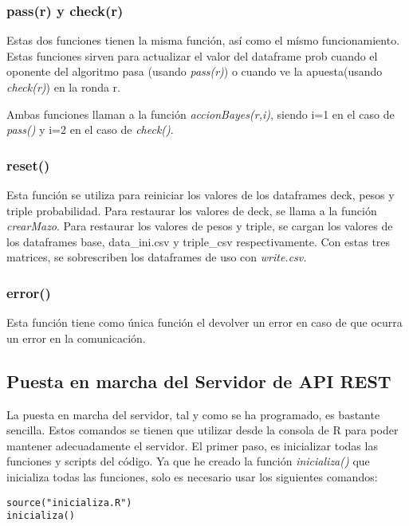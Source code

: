 \subsubsection{pass(r) y check(r)}

Estas dos funciones tienen la misma función, así como el mísmo funcionamiento. Estas funciones sirven para actualizar el valor del dataframe prob cuando el oponente del algoritmo pasa (usando  \textit{pass(r)}) o cuando ve la apuesta(usando  \textit{check(r)}) en la ronda r.

Ambas funciones llaman a la función  \textit{accionBayes(r,i)}, siendo i=1 en el caso de  \textit{pass()} y i=2 en el caso de  \textit{check()}.

\subsubsection{reset()}

Esta función se utiliza para reiniciar los valores de los dataframes deck, pesos y triple probabilidad.
Para restaurar los valores de deck, se llama a la función  \textit{crearMazo}.
Para restaurar los valores de pesos y triple, se cargan los valores de los dataframes base, data\_ini.csv y triple\_csv respectivamente. Con estas tres matrices, se sobrescriben los dataframes de uso con  \textit{write.csv.}


\subsubsection{error()}

Esta función tiene como única función el devolver un error en caso de que ocurra un error en la comunicación.


\subsection{Puesta en marcha del Servidor de API REST}
\label{sec:APIrest}

La puesta en marcha del servidor, tal y como se ha programado, es bastante sencilla. 
Estos comandos se tienen que utilizar desde la consola de R para poder mantener adecuadamente el servidor.
El primer paso, es inicializar todas las funciones y scripts del código. Ya que he creado la función  \textit{inicializa()} que inicializa todas las funciones, solo es necesario usar los siguientes comandos:

\begin{verbatim}
source("inicializa.R")
inicializa()
\end{verbatim}

